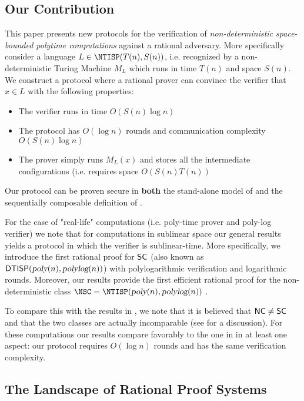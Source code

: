 \subsection{Our Contribution}

This paper presents new protocols for the verification of {\em non-deterministic space-bounded polytime computations} against a rational adversary. More specifically consider a language $L \in \NTISP(T(n), S(n))$, i.e. recognized by a non-deterministic Turing Machine $M_L$ which runs in time $T(n)$ and space $S(n)$. 
We construct a protocol where a rational prover can
convince the verifier that $x \in L$ with the following properties: 
\begin{itemize}
\item The verifier runs in time $O(S(n) \log n)$
\item The protocol has $O(\log n)$ rounds and communication complexity $O(S(n) \log n)$
\item The prover simply runs $M_L(x)$ and stores all the intermediate configurations (i.e. requires space $O(S(n) T(n))$
\end{itemize}
Our protocol can be proven secure in {\bf both} the stand-alone model of \cite{am} and the sequentially composable definition of \cite{cg15}. 

For the case of "real-life" computations (i.e. poly-time prover and poly-log verifier) we 
note that for computations in sublinear space our general results yields a protocol in which the verifier is sublinear-time. More specifically, we introduce the first rational proof for ${\mathsf{SC}}$ (also known as ${\mathsf{DTISP}}({\textsl{poly}}(n), {\textsl{polylog}}(n))$) with polylogarithmic verification and logarithmic rounds. Moreover, our results provide the first efficient rational proof for the non-deterministic class $\NSC = \NTISP(\poly(n), \polylog(n) )$ . 

To compare this with the results in \cite{ratsumchecks}, we note that it is believed that ${\mathsf{NC}} \not = {\mathsf{SC}}$ and that the two classes are actually incomparable (see \cite{SCcompleteness} for a discussion).
 For these computations our results compare
favorably to the one in \cite{ratsumchecks} in at least one aspect: our protocol requires $O(\log n )$ rounds and has the same verification complexity.

\subsection{The Landscape of Rational Proof Systems}

